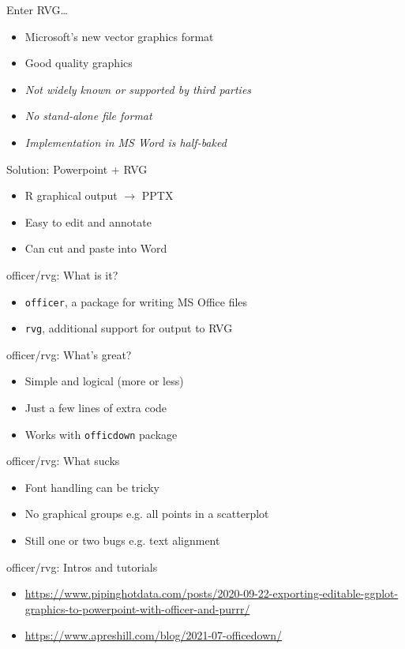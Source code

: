 \documentclass[aspectratio=169,12pt]{beamer} %
\begin{document}
\begin{frame}{Enter RVG\dots}
	\begin{itemize}
		\item Microsoft's new vector graphics format
		\item Good quality graphics
		\item \emph{Not widely known or supported by third parties}
		\item \emph{No stand-alone file format}
		\item \emph{Implementation in MS Word is half-baked}
	\end{itemize}
\end{frame}

\begin{frame}{Solution: Powerpoint + RVG}
	\begin{itemize}
		\item R graphical output $\rightarrow$ PPTX
		\item Easy to edit and annotate
		\item Can cut and paste into Word
	\end{itemize}
\end{frame}

\begin{frame}{officer/rvg: What is it?}
	\begin{itemize}
		\item \texttt{officer}, a package for writing MS Office files
		\item \texttt{rvg}, additional support for output to RVG
	\end{itemize}
\end{frame}

\begin{frame}{officer/rvg: What's great?}
	\begin{itemize}
		\item Simple and logical (more or less)
		\item Just a few lines of extra code
		\item Works with \texttt{officdown} package
	\end{itemize}
\end{frame}

\begin{frame}{officer/rvg: What sucks}
	\begin{itemize}
		\item Font handling can be tricky
		\item No graphical groups e.g. all points in a scatterplot
		\item Still one or two bugs e.g. text alignment
	\end{itemize}
\end{frame}

\begin{frame}{officer/rvg: Intros and tutorials}
	\begin{itemize}
		\item \scriptsize{\url{https://www.pipinghotdata.com/posts/2020-09-22-exporting-editable-ggplot-graphics-to-powerpoint-with-officer-and-purrr/}}
		\item \scriptsize{\url{https://www.apreshill.com/blog/2021-07-officedown/}}
	\end{itemize}
\end{frame}
\end{document}
